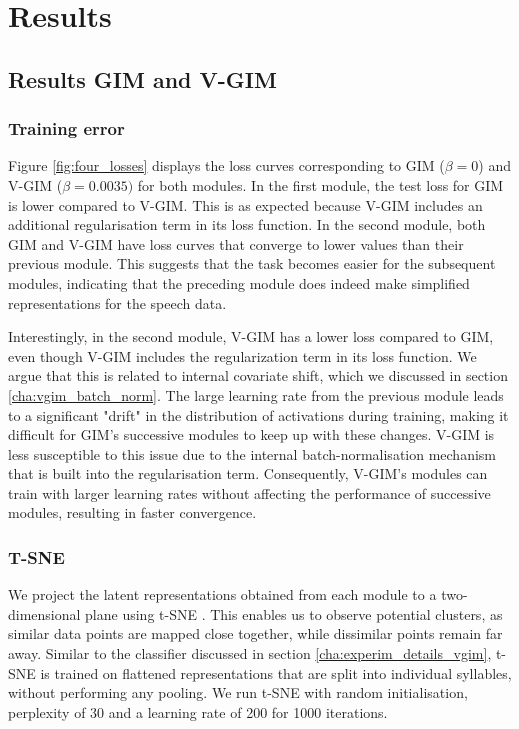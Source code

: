 		

\section{Results}

	\subsection{Results GIM and V-GIM}	
	\subsubsection{Training error}
		
		
		Figure \ref{fig:four_losses} displays the loss curves corresponding to GIM ($\beta=0$) and V-GIM ($\beta=0.0035)$ for both modules. In the first module, the test loss for GIM is lower compared to V-GIM. This is as expected because V-GIM includes an additional regularisation term in its loss function. In the second module, both GIM and V-GIM have loss curves that converge to lower values than their previous module. This suggests that the task becomes easier for the subsequent modules, indicating that the preceding module does indeed make simplified representations for the speech data.
		
		Interestingly, in the second module, V-GIM has a lower loss compared to GIM, even though V-GIM includes the regularization term in its loss function. We argue that this is related to internal covariate shift, which we discussed in section \ref{cha:vgim_batch_norm}. The large learning rate from the previous module leads to a significant "drift" in the distribution of activations during training, making it difficult for GIM's successive modules to keep up with these changes. V-GIM is less susceptible to this issue due to the internal batch-normalisation mechanism that is built into the regularisation term. Consequently, V-GIM's modules can train with larger learning rates without affecting the performance of successive modules, resulting in faster convergence.
		
		
		  



		
	\subsubsection{T-SNE} %
	We project the latent representations obtained from each module to a two-dimensional plane using t-SNE \cite{maatenVisualizingDataUsing2008}. This enables us to observe potential clusters, as similar data points are mapped close together, while dissimilar points remain far away. Similar to the classifier discussed in section \ref{cha:experim_details_vgim}, t-SNE is trained on flattened representations that are split into individual syllables, without performing any pooling. We run t-SNE with random initialisation, perplexity of 30 and a learning rate of 200 for 1000 iterations.
	
